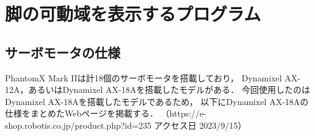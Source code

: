 ﻿
\chapter{脚の可動域を表示するプログラム}\label{chapter:leg_range_python}
\section{サーボモータの仕様}

PhantomX Mark I\hspace{-1.2pt}Iは計18個のサーボモータを搭載しており，
Dynamixel AX-12A，あるいはDynamixel AX-18Aを搭載したモデルがある．
今回使用したのはDynamixel AX-18Aを搭載したモデルであるため，
以下にDynamixel AX-18Aの仕様をまとめたWebページを掲載する．
（https://e-shop.robotis.co.jp/product.php?id=235 アクセス日 2023/9/15）

